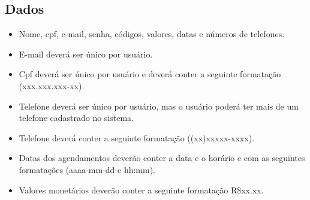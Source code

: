 \subsection{Dados}
\begin{itemize}
	\item Nome, cpf, e-mail, senha, códigos, valores, datas e números de telefones.
	\item E-mail deverá ser único por usuário.
	\item Cpf deverá ser único por usuário e deverá conter a seguinte formatação (xxx.xxx.xxx-xx).
	\item Telefone deverá ser único por usuário, mas o usuário poderá ter mais de um telefone cadastrado no sistema. 
	\item Telefone deverá conter a seguinte formatação ((xx)xxxxx-xxxx).
	\item Datas dos agendamentos deverão conter a data e o horário e com as seguintes formatações (aaaa-mm-dd e hh:mm).
	\item Valores monetários deverão conter a seguinte formatação R\$xx.xx.
\end{itemize}